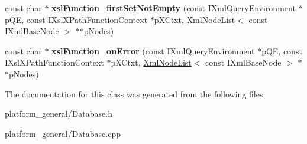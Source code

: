 \begin{DoxyCompactItemize}
\item 
\hypertarget{classgeneral__server_1_1XSLTCustomUtilities_a217e6dcf2bdfeb898619800b53b53123}{const char $\ast$ {\bfseries xsl\-Function\-\_\-first\-Set\-Not\-Empty} (const \-I\-Xml\-Query\-Environment $\ast$p\-Q\-E, const \-I\-Xsl\-X\-Path\-Function\-Context $\ast$p\-X\-Ctxt, \hyperlink{classgeneral__server_1_1XmlNodeList}{\-Xml\-Node\-List}$<$ const \-I\-Xml\-Base\-Node $>$ $\ast$$\ast$p\-Nodes)}\label{classgeneral__server_1_1XSLTCustomUtilities_a217e6dcf2bdfeb898619800b53b53123}

\item 
\hypertarget{classgeneral__server_1_1XSLTCustomUtilities_afa799da3706294171c2e0ebcf1ac38b8}{const char $\ast$ {\bfseries xsl\-Function\-\_\-on\-Error} (const \-I\-Xml\-Query\-Environment $\ast$p\-Q\-E, const \-I\-Xsl\-X\-Path\-Function\-Context $\ast$p\-X\-Ctxt, \hyperlink{classgeneral__server_1_1XmlNodeList}{\-Xml\-Node\-List}$<$ const \-I\-Xml\-Base\-Node $>$ $\ast$$\ast$p\-Nodes)}\label{classgeneral__server_1_1XSLTCustomUtilities_afa799da3706294171c2e0ebcf1ac38b8}

\end{DoxyCompactItemize}


\-The documentation for this class was generated from the following files\-:\begin{DoxyCompactItemize}
\item 
platform\-\_\-general/\-Database.\-h\item 
platform\-\_\-general/\-Database.\-cpp\end{DoxyCompactItemize}
